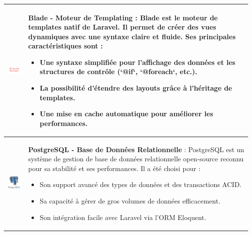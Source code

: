 \begin{longtable}{|m{4cm}|m{10cm}|}
    \includegraphics[width=3cm]{images/logo/blade.png} & 
    \textbf{Blade - Moteur de Templating} : Blade est le moteur de templates natif de Laravel. Il permet de créer des vues dynamiques avec une syntaxe claire et fluide. Ses principales caractéristiques sont :
    \begin{itemize}
        \item Une syntaxe simplifiée pour l'affichage des données et les structures de contrôle (`@if`, `@foreach`, etc.).
        \item La possibilité d’étendre des layouts grâce à l’héritage de templates.
        \item Une mise en cache automatique pour améliorer les performances.
    \end{itemize}\\
    \hline

    \includegraphics[width=3cm]{images/logo/postgresql.png} & 
    \textbf{PostgreSQL - Base de Données Relationnelle} : PostgreSQL est un système de gestion de base de données relationnelle open-source reconnu pour sa stabilité et ses performances. Il a été choisi pour :  
    \begin{itemize}
        \item Son support avancé des types de données et des transactions ACID.
        \item Sa capacité à gérer de gros volumes de données efficacement.
        \item Son intégration facile avec Laravel via l'ORM Eloquent.
    \end{itemize}\\
    \hline


\end{longtable}
